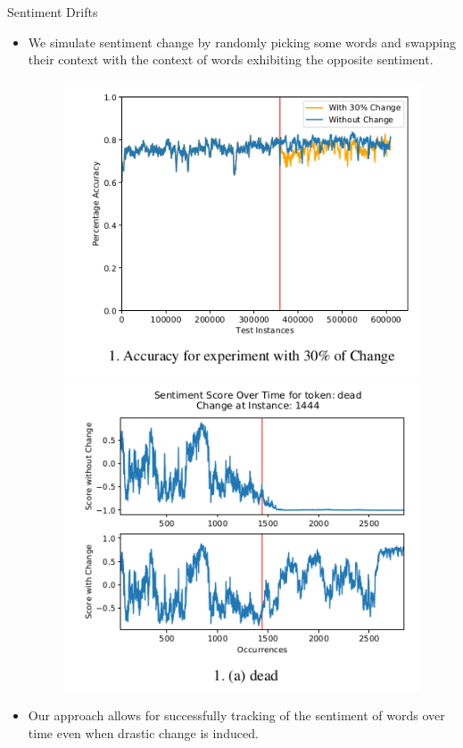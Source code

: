 \documentclass[handout]{beamer}
\begin{document}
\begin{frame}{Sentiment Drifts}
\begin{scriptsize}
\begin{itemize}
 \item We simulate sentiment change by randomly picking some words and swapping their context with the context of words exhibiting the opposite sentiment.

   \begin{figure}[h]
        	\includegraphics[scale = 0.25]{pics/change1.png}\includegraphics[scale = 0.3]{pics/change.png}
        \end{figure}

 \item Our approach allows for successfully tracking of the sentiment of words over time even when drastic change is induced.

\end{itemize}


\end{scriptsize}
\end{frame}
\end{document}
